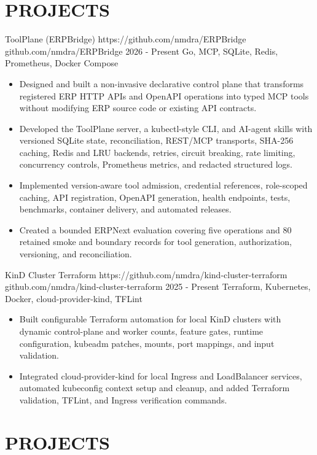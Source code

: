 \section{PROJECTS}

\projectentry
  {ToolPlane (ERPBridge)}
  {https://github.com/nmdra/ERPBridge}
  {github.com/nmdra/ERPBridge}
  {2026 - Present}
  {Go, MCP, SQLite, Redis, Prometheus, Docker Compose}

\begin{itemize}
  \item Designed and built a non-invasive declarative control plane that transforms registered ERP HTTP APIs and OpenAPI operations into typed MCP tools without modifying ERP source code or existing API contracts.
  \item Developed the ToolPlane server, a kubectl-style CLI, and AI-agent skills with versioned SQLite state, reconciliation, REST/MCP transports, SHA-256 caching, Redis and LRU backends, retries, circuit breaking, rate limiting, concurrency controls, Prometheus metrics, and redacted structured logs.
  \item Implemented version-aware tool admission, credential references, role-scoped caching, API registration, OpenAPI generation, health endpoints, tests, benchmarks, container delivery, and automated releases.
  \item Created a bounded ERPNext evaluation covering five operations and 80 retained smoke and boundary records for tool generation, authorization, versioning, and reconciliation.
\end{itemize}

\projectentry
  {KinD Cluster Terraform}
  {https://github.com/nmdra/kind-cluster-terraform}
  {github.com/nmdra/kind-cluster-terraform}
  {2025 - Present}
  {Terraform, Kubernetes, Docker, cloud-provider-kind, TFLint}

\begin{itemize}
  \item Built configurable Terraform automation for local KinD clusters with dynamic control-plane and worker counts, feature gates, runtime configuration, kubeadm patches, mounts, port mappings, and input validation.
  \item Integrated cloud-provider-kind for local Ingress and LoadBalancer services, automated kubeconfig context setup and cleanup, and added Terraform validation, TFLint, and Ingress verification commands.
\end{itemize}

\newpage
\section{PROJECTS}

